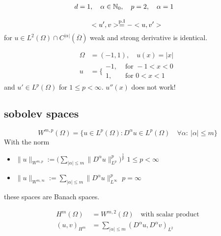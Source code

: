 \begin{example}
	\begin{align*}
	d&= 1, \quad \alpha \in \mathbb{N}_0, \quad p=2, \quad \alpha=1
	\end{align*}
	
	\begin{equation*}
	<u',v> \overset{\text{p.I} }{=} -<u,v'>\\
	\end{equation*}
	for $u \in L^2(\Omega)\cap C^{|\alpha|}( \overline{\Omega} )$ weak and strong derivative is identical.
\end{example}
\enter

\begin{example}

\begin{align*}
	\Omega &= (-1,1),\quad u(x) = |x|\\
	u&=  \Bigg\{
	\begin{array}{cl}
		-1 ,  &\text{ for } -1 < x < 0\\
		1 ,  &\text{ for } 0 < x <1 
	\end{array}
\end{align*}
and $u' \in L^p(\Omega)$ for $1 \leq p < \infty$. $u''(x)$ does not work!\enter
\end{example}

\subsection{sobolev spaces}

\begin{equation*}
	W^{m,p}(\Omega) = \big\{ u\in L^p(\Omega) : D^\alpha u \in L^p(\Omega) \quad \forall \alpha:\ |\alpha|\leq m \big\}
\end{equation*}
With the norm

\begin{itemize}
	\item $\| u\|_{W^{m,p}} := \Big ( \displaystyle\sum_{|\alpha|\leq m}  \| D^\alpha u \|^p_{L^p}  \Big )^{\frac{1}{p}}$ \qquad $1\leq p < \infty$
	\item  $\| u\|_{W^{m,\infty}} :=  \displaystyle\sum_{|\alpha|\leq m}  \| D^\alpha u \|^p_{L^\infty}  $ \qquad $ p = \infty$
\end{itemize}

these spaces are Banach spaces.


\begin{align*}
	H^m(\Omega) &= W^{m,2}(\Omega) \quad \text{with scalar product}\\
	(u,v)_{H^m} &= \displaystyle \sum_{|\alpha| \leq m} (D^\alpha u, D^\alpha v)_{L^2}
\end{align*}

